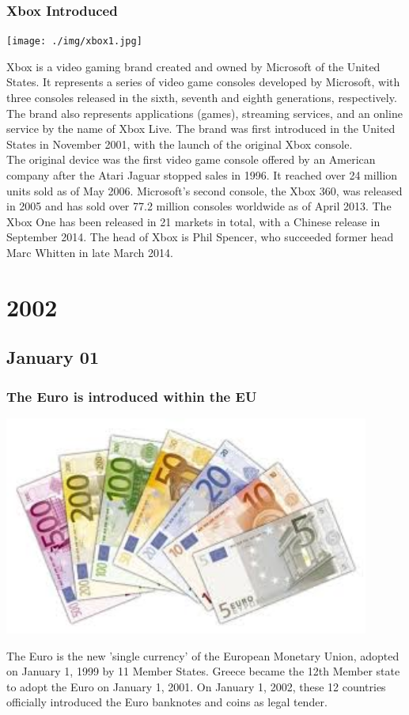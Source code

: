 \documentclass[11pt]{report}
\begin{document}
\subsection{Xbox Introduced}
\vspace{2mm}\begin{center}\texttt{[image: ./img/xbox1.jpg]}\end{center}
Xbox is a video gaming brand created and owned by Microsoft of the United States. It represents a series of video game consoles developed by Microsoft, with three consoles released in the sixth, seventh and eighth generations, respectively. The brand also represents applications (games), streaming services, and an online service by the name of Xbox Live. The brand was first introduced in the United States in November 2001, with the launch of the original Xbox console.\\
The original device was the first video game console offered by an American company after the Atari Jaguar stopped sales in 1996. It reached over 24 million units sold as of May 2006. Microsoft's second console, the Xbox 360, was released in 2005 and has sold over 77.2 million consoles worldwide as of April 2013. The Xbox One has been released in 21 markets in total, with a Chinese release in September 2014. The head of Xbox is Phil Spencer, who succeeded former head Marc Whitten in late March 2014.

\chapter{2002}
\section{January 01}
\subsection{The Euro is introduced within the EU}
\vspace{2mm}\begin{center}\includegraphics[width=12cm]{./img/euro.jpg}\end{center}
The Euro is the new 'single currency' of the European Monetary Union, adopted on January 1, 1999 by 11 Member States. Greece became the 12th Member state to adopt the Euro on January 1, 2001. On January 1, 2002, these 12 countries officially introduced the Euro banknotes and coins as legal tender.
\end{document}
